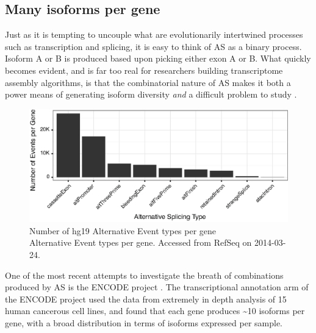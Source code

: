   \subsection{Many isoforms per gene}\label{Intro:subsec:IsoformsPerGene}

    Just as it is tempting to uncouple what are evolutionarily intertwined processes such as transcription and splicing, it is easy to think of AS as a binary process. Isoform A or B is produced based upon picking either exon A or B. What quickly becomes evident, and is far too real for researchers building transcriptome assembly algorithms, is that the combinatorial nature of AS makes it both a power means of generating isoform diversity \textit{and} a difficult problem to study \citep{Trapnell2012a}.

    \begin{figure} %
      \centering 
      \includegraphics{Figures/Intro/ASEventTypesPlot.eps}
      \caption[Number of hg19 Alternative Event types per gene]
      {
        Number of hg19 Alternative Event types per gene\\[0.25cm]
        Alternative Event types per gene. Accessed from RefSeq on 2014-03-24.
        }
      \label{Intro:fig:asEventsBarChart}
      \end{figure}

    One of the most recent attempts to investigate the breath of combinations produced by AS is the ENCODE project \citep{Birney2007,Dunham2012}. The transcriptional annotation arm of the ENCODE project \citep{Djebali2012,Derrien2012} used the data from extremely in depth analysis of 15 human cancerous cell lines, and found that each gene produces \textasciitilde10 isoforms per gene, with a broad distribution in terms of isoforms expressed per sample. 

